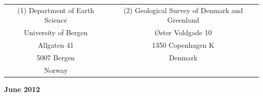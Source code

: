 \begin{titlepage}
\begin{center}
\vfill
\vfill
\vfill

\begin{tabular}{cc}
(1) Department of Earth Science & (2) Geological Survey of Denmark and Greenland \\
University of Bergen & \O ster Voldgade 10 \\
Allgaten 41 & 1350 Copenhagen K \\
5007 Bergen & Denmark \\
Norway &  \\
\end{tabular}

\vfill
\vfill
\vfill
\vfill
\vfill
\vfill
\vfill
\vfill
\textbf{June 2012}
\end{center}
\end{titlepage}

